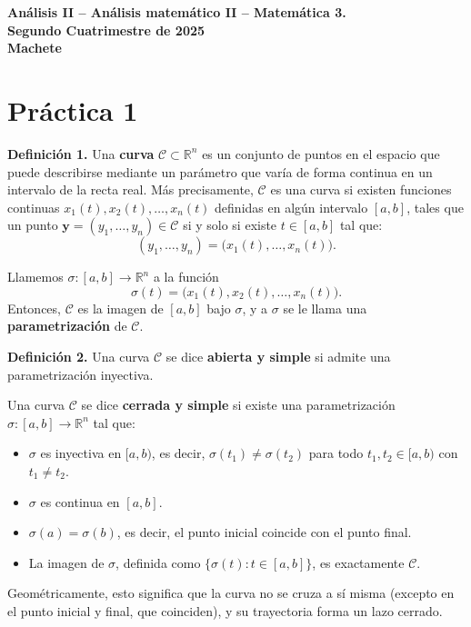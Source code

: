 \documentclass[11pt,a4paper,pdftex]{amsart}
\renewcommand{\bf}{\textbf}
\newcommand{\C}{\mathcal C}
\newcommand{\0}{\mathbb O}
\newcommand{\8}{\infty}
\begin{document}

\begin{center}

\bf{\Large An\'alisis II -- An\'alisis matem\'atico II -- Matem\'atica 3.} \\
\bigskip
\bf{\large Segundo Cuatrimestre de 2025}\\
\bigskip
\bf{Machete}
\end{center}


\bigskip\bigskip

\section{Práctica 1}

\noindent\textbf{Definici\'on 1.}  
Una \textbf{curva} $\C \subset \mathbb{R}^n$ es un conjunto de puntos en el espacio que puede describirse mediante un par\'ametro que var\'ia de forma continua en un intervalo de la recta real. M\'as precisamente, $\C$ es una curva si existen funciones continuas $x_1(t), x_2(t), \ldots, x_n(t)$ definidas en alg\'un intervalo $[a, b]$, tales que un punto $\mathbf{y} = (y_1, \ldots, y_n) \in \C$ si y solo si existe $t \in [a, b]$ tal que:  
\[
(y_1, \ldots, y_n) = \big(x_1(t), \ldots, x_n(t)\big).
\]  

Llamemos $\sigma : [a, b] \to \mathbb{R}^n$ a la funci\'on  
\[
\sigma(t) = \big(x_1(t), x_2(t), \ldots, x_n(t)\big).
\]  
Entonces, $\C$ es la imagen de $[a, b]$ bajo $\sigma$, y a $\sigma$ se le llama una \textbf{parametrizaci\'on} de $\C$.  

\bigskip

\noindent\textbf{Definici\'on 2.}  
Una curva $\C$ se dice \textbf{abierta y simple} si admite una parametrizaci\'on inyectiva.  

Una curva $\C$ se dice \textbf{cerrada y simple} si existe una parametrizaci\'on $\sigma : [a, b] \to \mathbb{R}^n$ tal que:  
\begin{itemize}
    \item $\sigma$ es inyectiva en $[a, b)$, es decir, $\sigma(t_1) \neq \sigma(t_2)$ para todo $t_1, t_2 \in [a, b)$ con $t_1 \neq t_2$.
    \item $\sigma$ es continua en $[a, b]$.
    \item $\sigma(a) = \sigma(b)$, es decir, el punto inicial coincide con el punto final.
    \item La imagen de $\sigma$, definida como $\{\sigma(t) : t \in [a, b]\}$, es exactamente $\C$.
\end{itemize}
Geom\'etricamente, esto significa que la curva no se cruza a s\'i misma (excepto en el punto inicial y final, que coinciden), y su trayectoria forma un lazo cerrado.
\end{document}

